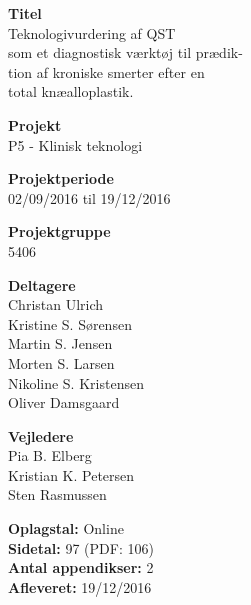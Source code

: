 \begin{minipage}[t]{0.48\textwidth}
\textbf{Titel} \\[5pt]\hspace*{2ex} 
Teknologivurdering af QST \\\hspace*{2ex} 
som et diagnostisk værktøj til prædik-\\\hspace*{2ex}
tion af kroniske  smerter efter en \\\hspace*{2ex}
total knæalloplastik.\\\hspace*{2ex}



\textbf{Projekt} \\[5pt]\hspace*{2ex} 
P5 - Klinisk teknologi\\\hspace*{2ex}


\textbf{Projektperiode} \\[5pt]\bigskip\hspace{2ex}
02/09/2016 til 19/12/2016

\textbf{Projektgruppe} \\[5pt]\bigskip\hspace{2ex}
5406

\textbf{Deltagere} \\[5pt]\hspace*{2ex}
Christan Ulrich \\\hspace*{2ex}
Kristine S. Sørensen \\\hspace*{2ex}
Martin S. Jensen \\\hspace*{2ex}
Morten S. Larsen\\\hspace*{2ex}
Nikoline S. Kristensen \\\hspace*{2ex}
Oliver Damsgaard \\\bigskip\hspace*{2ex}

\textbf{Vejledere} \\[5pt]\hspace*{2ex}
Pia B. Elberg \\\hspace*{2ex}
Kristian K. Petersen\\\hspace*{2ex}
Sten Rasmussen\\\smallskip\hspace*{2ex}

\textbf{Oplagstal:} Online \\
\textbf{Sidetal:} 97 (PDF: 106) \\
\textbf{Antal appendikser:} 2 \\ 
\textbf{Afleveret:} 19/12/2016

\end{minipage}
